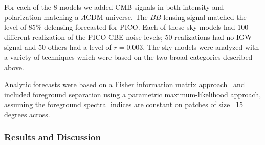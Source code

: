 \documentclass[PICOReport.tex]{subfiles}
\begin{document}
For each of the 8 models we added CMB signals in both intensity and polarization matching a $\Lambda$CDM universe. The $BB$-lensing signal matched the level of 85\% delensing forecasted for PICO. Each of these sky models had 100 different realization of the PICO CBE noise levels; 50 realizations had no \ac{IGW} signal and 50 others had a level of $r=0.003$. 
The sky models were analyzed with a variety of techniques which were based on the two broad categories described above. 

Analytic forecasts were based on a Fisher information matrix approach~\citep{errard_feeney_2016} and included foreground separation
using a parametric maximum-likelihood approach, assuming the foreground spectral indices are constant on patches of size ~15 degrees across. 



\subsubsection{Results and Discussion}
\end{document}
